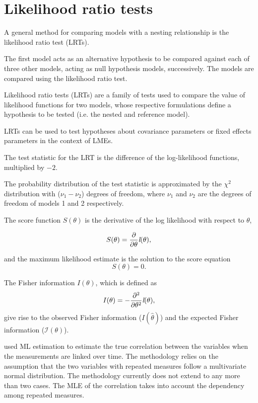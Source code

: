 \documentclass[12pt, a4paper]{report}
\theoremstyle{plain}
\theoremstyle{definition}
\theoremstyle{remark}
\begin{document}
 




\section{Likelihood ratio tests}
A general method for comparing models with a nesting relationship is the likelihood ratio test (LRTs). 

The first model acts as an alternative hypothesis to be compared against each of three other models, acting as null hypothesis models, successively. The models are compared using the likelihood ratio test. 
\bigskip

Likelihood ratio tests (LRTs) are a family of tests used to compare the value of likelihood functions for two models, whose respective formulations define a hypothesis to be tested (i.e. the nested and reference model).


LRTs can be used to test hypotheses about
covariance parameters or fixed effects parameters in the context
of LMEs.

The test statistic for the LRT is the difference of the log-likelihood functions, multiplied by $-2$.

The probability distribution of the test statistic is approximated by the $\chi^2$ distribution with ($\nu_{1} - \nu_{2}$) degrees of freedom, where $\nu_{1}$  and $\nu_{2}$ are the degrees of freedom of models 1 and 2 respectively.



The score function $S(\theta)$ is the derivative of the log likelihood with respect to $\theta$,

\[
S(\theta) = \frac{\partial}{\partial \theta}\emph{l}(\theta),
\]

and the maximum likelihood estimate is the solution to the score equation
\[
S(\theta) = 0.
\]


The Fisher information $I(\theta)$, which is defined as
\[
I(\theta) = - \frac{\partial^2}{\partial \theta^2}\emph{l}(\theta),
\]
give rise to the observed Fisher information ($I(\hat{\theta})$) and the expected Fisher information ($\mathcal{I}(\theta)$).




\citet{Lam} used ML estimation to estimate the true correlation between the variables when
the measurements are linked over time. The methodology relies on the assumption that the two variables with repeated measures follow a multivariate normal distribution. The methodology currently does not extend to any more than two cases. The MLE of the correlation takes into account the dependency among repeated measures.
\end{document}
